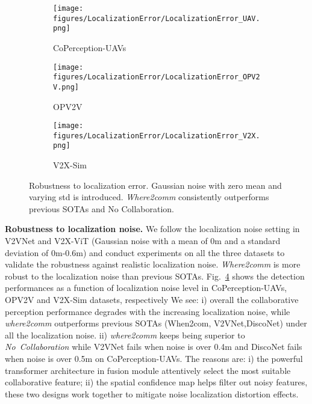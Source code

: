 \documentclass{article}
\begin{document}
\begin{figure}
    \centering
    \centering
  \begin{subfigure}{0.32\linewidth}
    \texttt{[image: figures/LocalizationError/LocalizationError\_UAV.png]}
\caption{CoPerception-UAVs}
    \label{fig:UAV}
  \end{subfigure}
\begin{subfigure}{0.32\linewidth}
    \texttt{[image: figures/LocalizationError/LocalizationError\_OPV2V.png]}
\caption{OPV2V}
    \label{fig:OPV2V}
  \end{subfigure}
  \begin{subfigure}{0.32\linewidth}
    \texttt{[image: figures/LocalizationError/LocalizationError\_V2X.png]}
\caption{V2X-Sim}
    \label{fig:V2X}
  \end{subfigure}
  \vspace{-1mm}
    \caption{Robustness to localization error. Gaussian noise with zero mean and varying std is introduced. \textit{Where2comm} consistently outperforms previous SOTAs and No Collaboration.}
    \label{fig:loc_noise}
    \vspace{-4mm}
\end{figure}

\textbf{Robustness to localization noise.}
We follow the localization noise setting in V2VNet and V2X-ViT (Gaussian noise with a mean of 0m and a standard deviation of 0m-0.6m) and conduct experiments on all the three datasets to validate the robustness against realistic localization noise. \textit{Where2comm} is more robust to the localization noise than previous SOTAs. Fig.~\ref{fig:loc_noise} shows the detection performances as a function of localization noise level in CoPerception-UAVs, OPV2V and V2X-Sim datasets, respectively We see: i) overall the collaborative perception performance degrades with the increasing localization noise, while \textit{where2comm} outperforms previous SOTAs (When2com, V2VNet,DiscoNet) under all the localization noise. ii) \textit{where2comm} keeps being superior to \textit{No~Collaboration} while V2VNet fails when noise is over 0.4m and DiscoNet fails when noise is over 0.5m on CoPerception-UAVs. The reasons are: i) the powerful transformer architecture in fusion module attentively select the most suitable collaborative feature; ii) the spatial confidence map helps filter out noisy features, these two designs work together to mitigate noise localization distortion effects.
\end{document}
